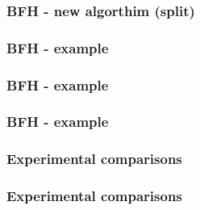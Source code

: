\documentclass[11pt,handout]{beamer}
\begin{document}
\begin{frame}[fragile]
  \frametitle{BFH - new algorthim (split)}
  \begin{algorithmic}[1]
    \Else
    \EndIf
    \EndFor
    \EndFor
    \EndFunction
  \end{algorithmic}
\end{frame}

\begin{frame}
  \frametitle{BFH - example}
\end{frame}

\begin{frame}
  \frametitle{BFH - example}
\end{frame}

\begin{frame}
  \frametitle{BFH - example}
\end{frame}

\begin{frame}
  \frametitle{Experimental comparisons}
\end{frame}

\begin{frame}
  \frametitle{Experimental comparisons}
\end{frame}
\end{document}
